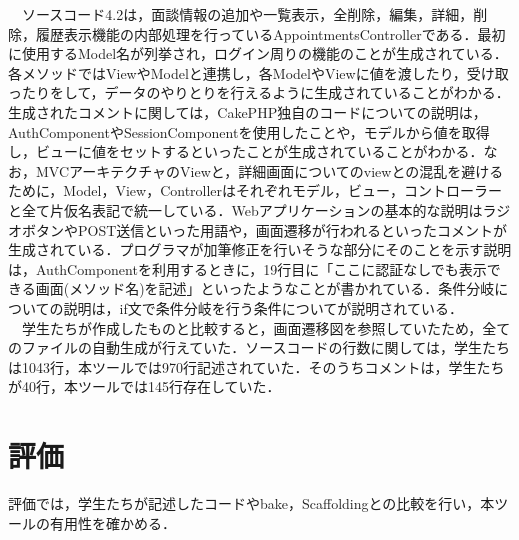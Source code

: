 \documentclass{funthesis}
\begin{document}
　ソースコード4.2は，面談情報の追加や一覧表示，全削除，編集，詳細，削除，履歴表示機能の内部処理を行っているAppointmentsControllerである．最初に使用するModel名が列挙され，ログイン周りの機能のことが生成されている．各メソッドではViewやModelと連携し，各ModelやViewに値を渡したり，受け取ったりをして，データのやりとりを行えるように生成されていることがわかる．生成されたコメントに関しては，CakePHP独自のコードについての説明は，AuthComponentやSessionComponentを使用したことや，モデルから値を取得し，ビューに値をセットするといったことが生成されていることがわかる．なお，MVCアーキテクチャのViewと，詳細画面についてのviewとの混乱を避けるために，Model，View，Controllerはそれぞれモデル，ビュー，コントローラーと全て片仮名表記で統一している．Webアプリケーションの基本的な説明はラジオボタンやPOST送信といった用語や，画面遷移が行われるといったコメントが生成されている．プログラマが加筆修正を行いそうな部分にそのことを示す説明は，AuthComponentを利用するときに，19行目に「ここに認証なしでも表示できる画面(メソッド名)を記述」といったようなことが書かれている．条件分岐についての説明は，if文で条件分岐を行う条件についてが説明されている．\\
　学生たちが作成したものと比較すると，画面遷移図を参照していたため，全てのファイルの自動生成が行えていた．ソースコードの行数に関しては，学生たちは1043行，本ツールでは970行記述されていた．そのうちコメントは，学生たちが40行，本ツールでは145行存在していた．

\chapter{評価}
評価では，学生たちが記述したコードやbake，Scaffoldingとの比較を行い，本ツールの有用性を確かめる．
\end{document}
